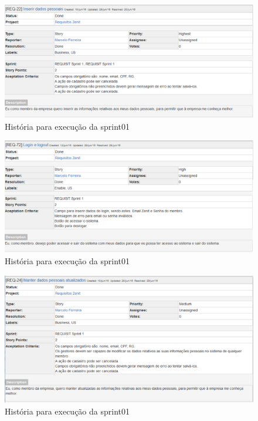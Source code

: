 \begin{figure}[H]
    \centering
    \includegraphics[keepaspectratio=true,scale=0.6]{figuras/us03.eps}
    \caption[História da sprint 01]{História para execução da sprint01}
\end{figure}
\begin{figure}[H]
    \centering
    \includegraphics[keepaspectratio=true,scale=0.6]{figuras/us04.eps}
    \caption[História da sprint 01]{História para execução da sprint01}
\end{figure}
\begin{figure}[H]
    \centering
    \includegraphics[keepaspectratio=true,scale=0.6]{figuras/us05.eps}
    \caption[História da sprint 01]{História para execução da sprint01}
\end{figure}
